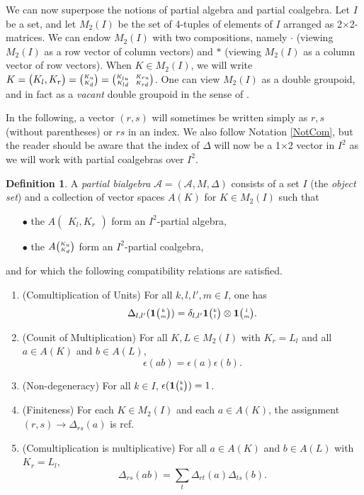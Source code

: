\documentclass[11pt]{article}
\newcommand{\Grs}[3]{#1{\begin{pmatrix} #2,  #3\end{pmatrix}}}
\newcommand{\Grt}[3]{#1{\tiny {\begin{pmatrix} #2\\#3\end{pmatrix}}}}
\newcommand{\UnitC}[2]{\Grt{\mathbf{1}}{#1}{#2}}
\newcommand{\eGr}[5]{#1{{\tiny \begin{pmatrix} #2 \quad #3 \\ #4 \quad #5\end{pmatrix}}}}
\theoremstyle{definition}
\newtheorem{Def}[Theorem]{Definition}
\numberwithin{equation}{section}
\begin{document}
We can now superpose the notions of partial algebra and partial coalgebra. Let $I$ be a set, and let $M_2(I)$ be the set of 4-tuples of elements of $I$ arranged as 2$\times$2-matrices. We can endow $M_2(I)$ with two compositions, namely $\cdot$ (viewing $M_2(I)$ as a row vector of column vectors) and $*$ (viewing $M_2(I)$ as a column vector of row vectors). When $K\in M_2(I)$, we will write $K = \Grs{}{K_l}{K_r} = \Grt{}{K_u}{K_d} = \eGr{}{K_{lu}}{K_{ru}}{K_{ld}}{K_{rd}}$. One can view $M_2(I)$ as a double groupoid, and in fact as a \emph{vacant} double groupoid in the sense of \cite{AN1}. 

In the following, a vector $(r,s)$ will sometimes be written simply as $r,s$ (without parentheses) or $rs$ in an index. We also follow Notation \ref{NotCom}, but the reader should be aware that the index of $\Delta$ will now be a 1$\times$2 vector in $I^2$ as we will work with partial coalgebras over $I^2$.

\begin{Def}\label{DefPartBiAlg} A \emph{partial bialgebra} $\mathscr{A}=(\mathscr{A},M,\Delta)$ consists of a set $I$ (the \emph{object set}) and a collection of vector spaces $A(K)$ for $K\in M_2(I)$ such that 
\begin{itemize}
\item[$\bullet$] the $\Grs{A}{K_l}{K_r}$ form an $I^2$-partial algebra,
\item[$\bullet$] the $\Grt{A}{K_u}{K_d}$ form an $I^2$-partial coalgebra,
\end{itemize} 
and for which the following compatibility relations are satisfied.
\begin{enumerate}[label=(\arabic*)]
\item\label{Propa} (Comultiplication of Units) For all $k,l,l',m\in I$, one has 
\[\Delta_{l,l'}(\UnitC{k}{m}) = \delta_{l,l'} \UnitC{k}{l}\otimes \UnitC{l}{m}.\]  
\item\label{Propb} (Counit of Multiplication) For all $K,L\in M_2(I)$ with $K_r = L_l$ and all $a\in A(K)$ and $b\in A(L)$, \[\epsilon(ab) = \epsilon(a)\epsilon(b).\]%
\item\label{Propc} (Non-degeneracy) For all $k\in I$, $\epsilon(\UnitC{k}{k})=1$. 
\item\label{Propd} (Finiteness) For each $K\in M_2(I)$ and each $a\in A(K)$, the assignment $(r,s)\rightarrow \Delta_{rs}(a)$ is rcf.
\item\label{Prope} (Comultiplication is multiplicative) For all $a\in A(K)$ and $b\in A(L)$ with $K_r= L_l$,  \[\Delta_{rs}(ab) = \sum_t \Delta_{rt}(a)\Delta_{ts}(b).\]
\end{enumerate}
\end{Def}
\end{document}
